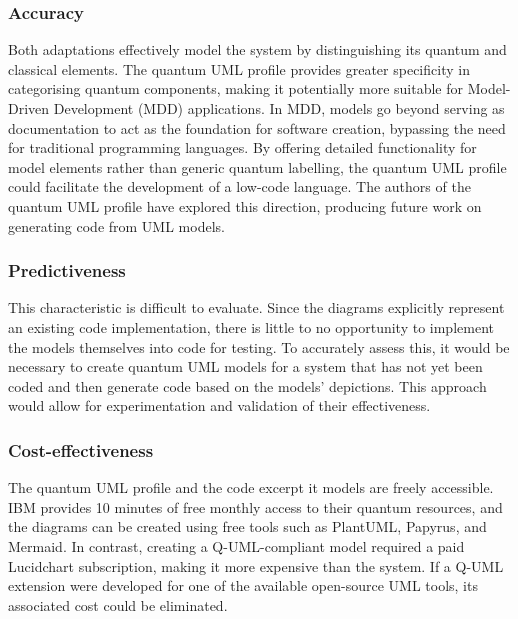 \documentclass{article}
\begin{document}
\subsubsection{Accuracy}

Both adaptations effectively model the system by distinguishing its quantum and classical elements. The quantum UML profile provides greater specificity in categorising quantum components, making it potentially more suitable for Model-Driven Development (MDD) applications. In MDD, models go beyond serving as documentation to act as the foundation for software creation, bypassing the need for traditional programming languages\cite{LUCIO2014103}. By offering detailed functionality for model elements rather than generic quantum labelling, the quantum UML profile could facilitate the development of a low-code language. The authors of the quantum UML profile have explored this direction, producing future work on generating code from UML models\cite{10.1007/978-3-030-85347-1_16}\cite{10313607}\cite{Jimenez-Navajas2022}\cite{PrezCastillo2020ReengineeringOI}\cite{10.1007/978-3-030-58793-2_20}\cite{Jiménez-Navajas2024}.

\subsubsection{Predictiveness}

This characteristic is difficult to evaluate. Since the diagrams explicitly represent an existing code implementation, there is little to no opportunity to implement the models themselves into code for testing. To accurately assess this, it would be necessary to create quantum UML models for a system that has not yet been coded and then generate code based on the models' depictions. This approach would allow for experimentation and validation of their effectiveness.

\subsubsection{Cost-effectiveness}

The quantum UML profile and the code excerpt it models are freely accessible. IBM provides 10 minutes of free monthly access to their quantum resources, and the diagrams can be created using free tools such as PlantUML, Papyrus, and Mermaid. In contrast, creating a Q-UML-compliant model required a paid Lucidchart subscription, making it more expensive than the system. If a Q-UML extension were developed for one of the available open-source UML tools, its associated cost could be eliminated.
\end{document}
